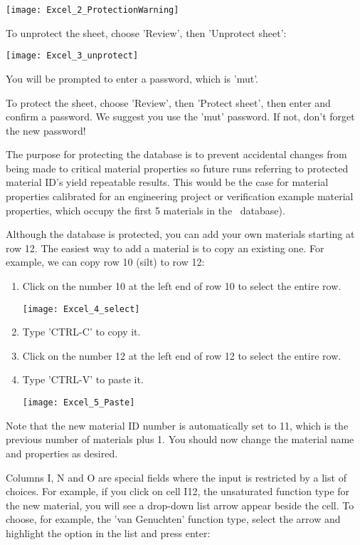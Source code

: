     \texttt{[image: Excel\_2\_ProtectionWarning]}
    
To unprotect the sheet, choose 'Review', then 'Unprotect sheet':
    
   \texttt{[image: Excel\_3\_unprotect]}
   
You will be prompted to enter a password, which is 'mut'.   

To protect the sheet, choose 'Review', then 'Protect sheet', then enter and confirm a password.  We suggest you use the 'mut' password.  If not, don't forget the new password! 

The purpose for protecting the database is to prevent accidental changes from being made to critical material properties so future runs referring to protected material ID's yield repeatable results.  This would be the case for material properties calibrated for an engineering project or verification example material properties, which occupy the first 5 materials in the \gwf\ database).

Although the database is protected, you can add your own materials starting at row 12.  The easiest way to add a material is to copy an existing one.  For example, we can copy row 10 (silt) to row 12:
\begin{enumerate}
    \item Click on the number 10 at the left end of row 10 to select the entire row.

   \texttt{[image: Excel\_4\_select]}

    \item Type 'CTRL-C' to copy it. 
    \item Click on the number 12 at the left end of row 12 to select the entire row.
    \item Type 'CTRL-V' to paste it.

   \texttt{[image: Excel\_5\_Paste]}
        
\end{enumerate}
Note that the new material ID number is automatically set to 11, which is the previous number of materials plus 1. You should now change the material name and properties as desired.

Columns I, N and O are special fields where the input is restricted by a list of choices.  For example, if you click on cell I12, the unsaturated function type for the new material, you will see a drop-down list arrow appear beside the cell.  To choose, for example, the 'van Genuchten' function type, select the arrow and highlight the option in the list and press enter:

